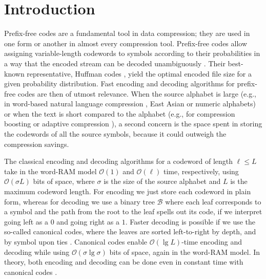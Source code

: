 \documentclass[preprint,12pt]{elsarticle}
\newcommand{\Oh}[1]{\ensuremath{\mathcal{O}\!\left({#1}\right)}}
\newcommand{\B}{\mathcal{B}}
\renewcommand{\log}{\lg}
\begin{document}
\section{Introduction}
\label{sec:introduction}

Prefix-free codes are a fundamental tool in data compression;
they are used in one form or another in almost every compression tool. 
Prefix-free codes allow assigning variable-length codewords to symbols 
according to their probabilities in a way that the encoded stream can be
decoded unambiguously \cite[Ch.\ 5]{CT06}. Their best-known representative, 
Huffman codes \cite{Huf52}, yield the optimal encoded file size for a given 
probability distribution. Fast encoding and decoding algorithms for prefix-free 
codes are then of utmost relevance. When the source alphabet is large (e.g., in
word-based natural language compression \cite{Mof89,ZMNBY00}, East Asian or
numeric alphabets) or when the text is short compared to the alphabet (e.g.,
for compression boosting \cite{FGMS05} or adaptive compression \cite{BFNP07}),
a second concern is the space spent in storing the codewords of all the source 
symbols, because it could outweigh the compression savings.

The classical encoding and decoding algorithms for a codeword of length $\ell
\le L$ take in the word-RAM model $\Oh{1}$ and $\Oh{\ell}$ time, respectively, using $\Oh{\sigma L}$
bits of space, where $\sigma$ is the size of the source alphabet and $L$ is
the maximum codeword length. For encoding we just store each codeword in plain 
form, whereas for decoding we use a binary tree $\B$ where each leaf corresponds
to a symbol and the path from the root to the leaf spells out its code, if we 
interpret going left as a $0$ and going right as a $1$. Faster decoding is 
possible if we use the so-called canonical codes, where the leaves are sorted 
left-to-right by depth, and by symbol upon ties \cite{SK64}. Canonical codes 
enable $\Oh{\log L}$-time encoding and decoding while using 
$\Oh{\sigma\log\sigma}$ bits of space, again in the word-RAM model. 
In theory, both encoding and decoding 
can be done even in constant time with canonical codes \cite{GNNO15}.
\end{document}
